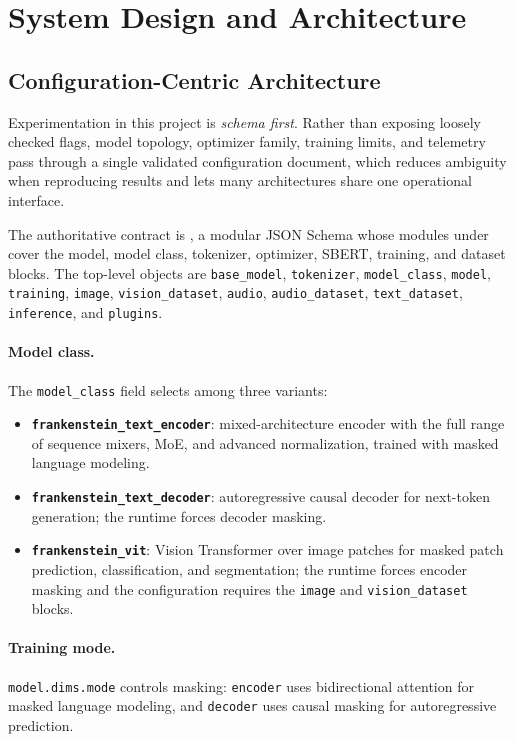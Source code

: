 \section{System Design and Architecture}
\label{sec:system-design}

\subsection{Configuration-Centric Architecture}
\label{sec:config-centric-architecture}

Experimentation in this project is \emph{schema first}. Rather than exposing loosely checked flags, model topology, optimizer family, training limits, and telemetry pass through a single validated configuration document, which reduces ambiguity when reproducing results and lets many architectures share one operational interface.

The authoritative contract is , a modular JSON Schema whose modules under  cover the model, model class, tokenizer, optimizer, SBERT, training, and dataset blocks. The top-level objects are \texttt{base\_model}, \texttt{tokenizer}, \texttt{model\_class}, \texttt{model}, \texttt{training}, \texttt{image}, \texttt{vision\_dataset}, \texttt{audio}, \texttt{audio\_dataset}, \texttt{text\_dataset}, \texttt{inference}, and \texttt{plugins}.

\paragraph{Model class.} The \texttt{model\_class} field selects among three variants:
\begin{itemize}[leftmargin=*]
    \item \textbf{\texttt{frankenstein\_text\_encoder}}: mixed-architecture encoder with the full range of sequence mixers, MoE, and advanced normalization, trained with masked language modeling.
    \item \textbf{\texttt{frankenstein\_text\_decoder}}: autoregressive causal decoder for next-token generation; the runtime forces decoder masking.
    \item \textbf{\texttt{frankenstein\_vit}}: Vision Transformer over image patches for masked patch prediction, classification, and segmentation; the runtime forces encoder masking and the configuration requires the \texttt{image} and \texttt{vision\_dataset} blocks.
\end{itemize}

\paragraph{Training mode.} \texttt{model.dims.mode} controls masking: \texttt{encoder} uses bidirectional attention for masked language modeling, and \texttt{decoder} uses causal masking for autoregressive prediction.

